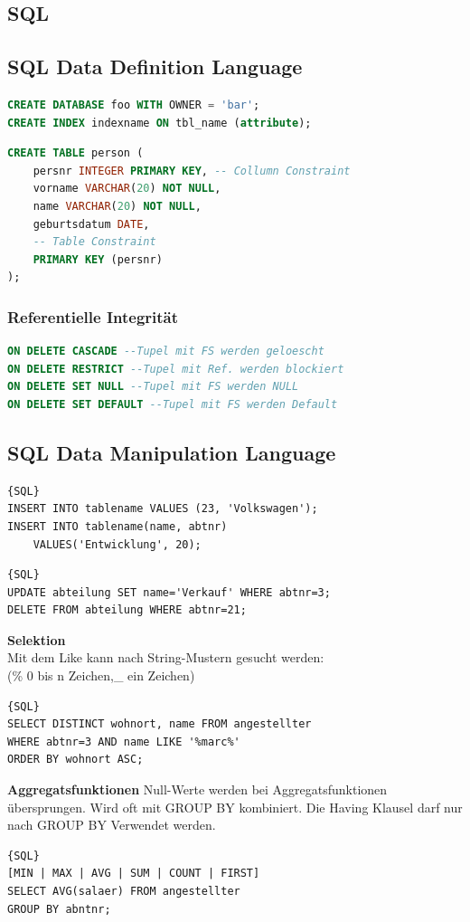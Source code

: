 \documentclass[7pt,landscape,a4paper]{scrartcl}
\begin{document}
\begin{multicols*}{4}
\section{SQL}
\subsection{SQL Data Definition Language}
\begin{lstlisting}[language=SQL]
CREATE DATABASE foo WITH OWNER = 'bar';
CREATE INDEX indexname ON tbl_name (attribute);
\end{lstlisting}
\begin{lstlisting}[language=SQL]
CREATE TABLE person (
	persnr INTEGER PRIMARY KEY, -- Collumn Constraint
	vorname VARCHAR(20) NOT NULL,
	name VARCHAR(20) NOT NULL,
	geburtsdatum DATE,
	-- Table Constraint
	PRIMARY KEY (persnr)
);
\end{lstlisting}
\subsubsection{Referentielle Integrität}

\begin{lstlisting}[language=SQL]
ON DELETE CASCADE --Tupel mit FS werden geloescht
ON DELETE RESTRICT --Tupel mit Ref. werden blockiert
ON DELETE SET NULL --Tupel mit FS werden NULL
ON DELETE SET DEFAULT --Tupel mit FS werden Default
\end{lstlisting}
\subsection{SQL Data Manipulation Language}
\begin{lstlisting}{SQL}
INSERT INTO tablename VALUES (23, 'Volkswagen');
INSERT INTO tablename(name, abtnr)
	VALUES('Entwicklung', 20);
\end{lstlisting}
\begin{lstlisting}{SQL}
UPDATE abteilung SET name='Verkauf' WHERE abtnr=3;
DELETE FROM abteilung WHERE abtnr=21;
\end{lstlisting}
\textbf{Selektion} \\
Mit dem Like kann nach String-Mustern gesucht werden:\\
 (\% 0 bis n Zeichen,\_ ein Zeichen) 
\begin{lstlisting}{SQL}
SELECT DISTINCT wohnort, name FROM angestellter
WHERE abtnr=3 AND name LIKE '%marc%'
ORDER BY wohnort ASC;
\end{lstlisting}
\textbf{Aggregatsfunktionen}
Null-Werte werden bei Aggregatsfunktionen übersprungen. Wird oft mit GROUP BY kombiniert. Die Having Klausel darf nur nach GROUP BY Verwendet werden.
\begin{lstlisting}{SQL}
[MIN | MAX | AVG | SUM | COUNT | FIRST]
SELECT AVG(salaer) FROM angestellter
GROUP BY abntnr;
\end{lstlisting}

\end{multicols*}
\end{document}

